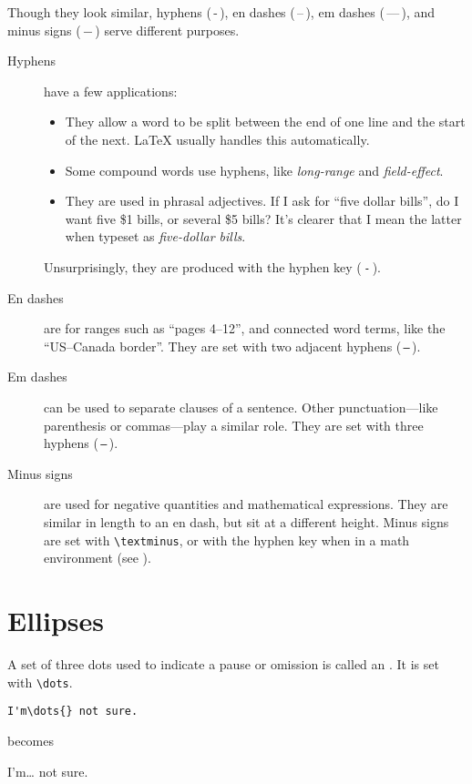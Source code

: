 Though they look similar,
hyphens (\,-\,), en dashes (\,--\,),
em dashes (\,---\,), and minus signs (\,$-$\,)
serve different purposes.
\begin{description}
\item[Hyphens] have a few applications:
    \begin{itemize}[leftmargin=*]
    \item They allow a word to be split between the end of one line and the
        start of the next.
        \LaTeX{} usually handles this automatically.
    \item Some compound words use hyphens, like \emph{long-range}
        and \emph{field-effect}.
    \item They are used in phrasal adjectives.
        If I ask for ``five dollar bills''\punckern,
        do I want five \$1 bills, or several \$5 bills?
        It's clearer that I mean the latter when typeset as
        \emph{five-dollar bills}.
    \end{itemize}
    Unsurprisingly, they are produced with the hyphen key (\,\texttt{-}\,).

\item[En dashes] are for ranges such as ``pages 4--12''\quotekern,
    and connected word terms, like the \mbox{``US--Canada} border''\quotekern.
    They are set with two adjacent hyphens (\,\texttt{--}\,).

\item[Em dashes] can be used to separate clauses of a sentence.
    Other punctuation---like parenthesis or commas---play a similar
    role.
    They are set with three hyphens (\,\texttt{---}\,).

\item[Minus signs] are used for negative quantities and
    mathematical expressions.
    They are similar in length to an en dash,
    but sit at a different height.
    Minus signs are set with \verb|\textminus|, or with the hyphen key when in
    a math environment (see ).
\end{description}

\section{Ellipses}

A set of three dots used to indicate a pause or omission is called an
.
It is set with \verb|\dots|.
\begin{leftfigure}
\begin{lstlisting}
I'm\dots{} not sure.
\end{lstlisting}
\end{leftfigure}
becomes
\begin{leftfigure}
\lm%
I'm\dots{} not sure.
\end{leftfigure}

